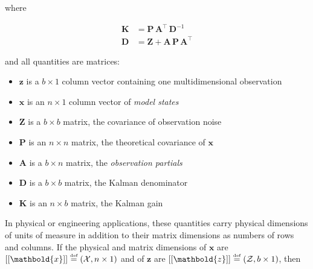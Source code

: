 \documentclass[10pt,oneside,x11names]{article}
\begin{document}
\noindent where

\begin{align}
\label{eqn:kalman-gain-definition}
\mathbold{K}
&=
\mathbold{P}\,
\mathbold{A}^\intercal\,
\mathbold{D}^{-1} \\
\label{eqn:kalman-denominator-definition}
\mathbold{D}
&= \mathbold{Z} +
\mathbold{A}\,
\mathbold{P}\,
\mathbold{A}^\intercal
\end{align}

\noindent and all quantities are matrices:

\begin{itemize}
\item \(\mathbold{z}\) is a  \({b}\times{1}\) column vector containing one multidimensional observation
\item \(\mathbold{x}\) is an \({n}\times{1}\) column vector of \emph{model states}
\item \(\mathbold{Z}\) is a  \({b}\times{b}\) matrix, the covariance of
observation noise
\item \(\mathbold{P}\) is an \({n}\times{n}\) matrix, the theoretical
covariance of \(\mathbold{x}\)
\item \(\mathbold{A}\) is a  \({b}\times{n}\) matrix, the \emph{observation partials}
\item \(\mathbold{D}\) is a  \({b}\times{b}\) matrix, the Kalman denominator
\item \(\mathbold{K}\) is an \({n}\times{b}\) matrix, the Kalman gain
\end{itemize}

In physical or engineering applications, these quantities carry physical
dimensions of units of measure in addition to their matrix dimensions as numbers
of rows and columns. 
If the physical and matrix dimensions of 
\(\mathbold{x}\) 
are
\(\left[\left[\mathbold{x}\right]\right]
\stackrel{\text{\tiny def}}{=}
(\mathcal{X}, n\times{1})\)
and of 
\(\mathbold{z}\) 
are
\(\left[\left[\mathbold{z}\right]\right]
\stackrel{\text{\tiny def}}{=}
(\mathcal{Z}, b\times{1})\), then
\end{document}
